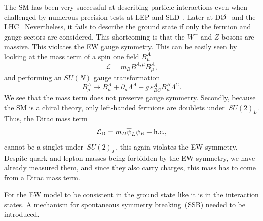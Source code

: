 \par The SM has been very successful at describing particle interactions even when challenged by numerous precision tests at LEP and SLD~\cite{ALEPH:2005ab,SLD:2000jop,Group:2012gb,ALEPH:2013dgf}. Later at D\O~\cite{2011baz} and the LHC~\cite{CMS:2014mgj,ATLAS:2017rzl} Nevertheless, it fails to describe the ground state if only the fermion and gauge sectors are considered. This shortcoming is that the $W^\pm$ and $Z$ bosons are massive. This violates the EW gauge symmetry. This can be easily seen by looking at the mass term of a spin one field $B^A_\mu$
\begin{equation}
	\mathcal{L} = m_B B^{A,\mu}B^A_\mu,
\end{equation}
and performing an $SU(N)$ gauge transformation 
\begin{equation}
	B^A_\mu \to B^A_\mu+\partial_\mu \Lambda ^A+g \,\varepsilon^A_{BC} B^B_\mu \Lambda^C.
\end{equation}
We see that the mass term does not preserve gauge symmetry.
Secondly, because the SM is a chiral theory, only left-handed fermions are doublets under~$SU(2)_L$. Thus, the Dirac mass term
\begin{equation}
	\mathcal{L}_{\mathrm{D}} = m_D \overline \psi_L \psi_R+ \mathrm{h.c.},
\end{equation}          
cannot be a singlet under~$SU(2)_L$, this again violates the EW symmetry. Despite quark and lepton masses being forbidden by the EW symmetry, we have already measured them, and since they also carry charges, this mass has to come from a Dirac mass term. 
\par For the EW model to be consistent in the ground state like it is in the interaction states. A mechanism for spontaneous symmetry breaking~(SSB) needed to be introduced. 
